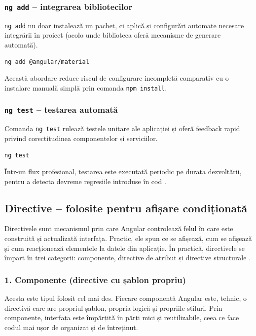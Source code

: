 \subsubsection{\texttt{ng add} -- integrarea bibliotecilor}
\texttt{ng add} nu doar instalează un pachet, ci aplică și configurări automate necesare integrării în proiect (acolo unde biblioteca oferă mecanisme de generare automată).

\begin{lstlisting}[language=bash]
ng add @angular/material
\end{lstlisting}

Această abordare reduce riscul de configurare incompletă comparativ cu o instalare manuală simplă prin comanda \texttt{npm install}.

\subsubsection{\texttt{ng test} -- testarea automată}
Comanda \texttt{ng test} rulează testele unitare ale aplicației și oferă feedback rapid privind corectitudinea componentelor și serviciilor.

\begin{lstlisting}[language=bash]
ng test
\end{lstlisting}

Într-un flux profesional, testarea este executată periodic pe durata dezvoltării, pentru a detecta devreme regresiile introduse în cod \cite{google_angular_cli_2026}.

\subsection{Directive -- folosite pentru afișare condiționată}
Directivele sunt mecanismul prin care Angular controlează felul în care este construită și actualizată interfața. Practic, ele spun ce se afișează, cum se afișează și cum reacționează elementele la datele din aplicație. În practică, directivele se împart în trei categorii: componente, directive de atribut și directive structurale \cite{google_angular_2024,angular_directives_2026}.

\subsubsection{1. Componente (directive cu șablon propriu)}
Acesta este tipul folosit cel mai des. Fiecare componentă Angular este, tehnic, o directivă care are propriul șablon, propria logică și propriile stiluri. Prin componente, interfața este împărțită în părți mici și reutilizabile, ceea ce face codul mai ușor de organizat și de întreținut.

